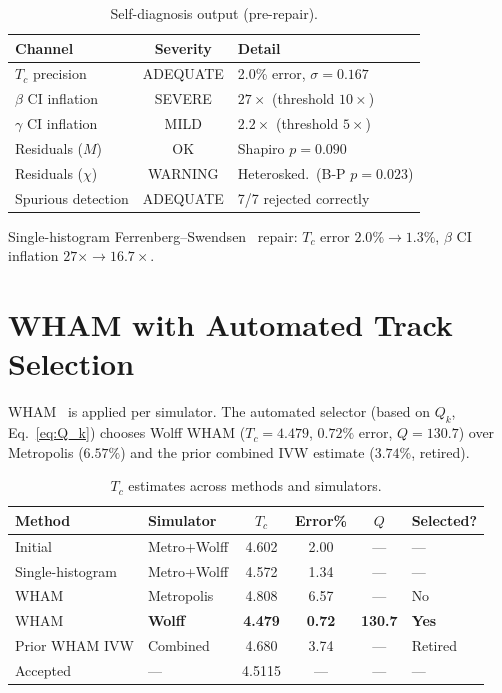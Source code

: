 \documentclass[11pt,a4paper]{article}
\begin{document}
\begin{table}[ht]
\centering
\caption{Self-diagnosis output (pre-repair).}
\label{tab:diagnosis}
\begin{tabular}{@{}lcl@{}}
\toprule
Channel & Severity & Detail \\
\midrule
$T_c$ precision & ADEQUATE & 2.0\% error, $\sigma = 0.167$ \\
$\beta$ CI inflation & SEVERE & $27\times$ (threshold $10\times$) \\
$\gamma$ CI inflation & MILD & $2.2\times$ (threshold $5\times$) \\
Residuals ($M$) & OK & Shapiro $p = 0.090$ \\
Residuals ($\chi$) & WARNING & Heterosked.\ (B-P $p = 0.023$) \\
Spurious detection & ADEQUATE & 7/7 rejected correctly \\
\bottomrule
\end{tabular}
\end{table}

Single-histogram Ferrenberg--Swendsen~\cite{ferrenberg1988} repair: $T_c$ error $2.0\% \to 1.3\%$, $\beta$ CI inflation $27\times \to 16.7\times$.

\section{WHAM with Automated Track Selection}\label{sec:wham}

WHAM~\cite{kumar1992} is applied per simulator. The automated selector (based on $Q_k$, Eq.~\ref{eq:Q_k}) chooses Wolff WHAM ($T_c = 4.479$, $0.72\%$ error, $Q = 130.7$) over Metropolis ($6.57\%$) and the prior combined IVW estimate ($3.74\%$, retired).

\begin{table}[ht]
\centering
\caption{$T_c$ estimates across methods and simulators.}
\label{tab:Tc}
\begin{tabular}{@{}llcccl@{}}
\toprule
Method & Simulator & $T_c$ & Error\% & $Q$ & Selected? \\
\midrule
Initial & Metro+Wolff & 4.602 & 2.00 & --- & --- \\
Single-histogram & Metro+Wolff & 4.572 & 1.34 & --- & --- \\
WHAM & Metropolis & 4.808 & 6.57 & --- & No \\
WHAM & \textbf{Wolff} & \textbf{4.479} & \textbf{0.72} & \textbf{130.7} & \textbf{Yes} \\
Prior WHAM IVW & Combined & 4.680 & 3.74 & --- & Retired \\
Accepted~\cite{hasenbusch2010} & --- & 4.5115 & --- & --- & --- \\
\bottomrule
\end{tabular}
\end{table}
\end{document}
